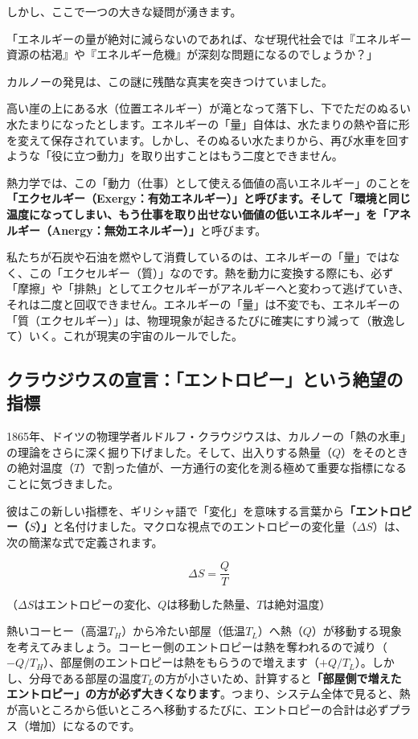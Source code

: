 しかし、ここで一つの大きな疑問が湧きます。

「エネルギーの量が絶対に減らないのであれば、なぜ現代社会では『エネルギー資源の枯渇』や『エネルギー危機』が深刻な問題になるのでしょうか？」

カルノーの発見は、この謎に残酷な真実を突きつけていました。

高い崖の上にある水（位置エネルギー）が滝となって落下し、下でただのぬるい水たまりになったとします。エネルギーの「量」自体は、水たまりの熱や音に形を変えて保存されています。しかし、そのぬるい水たまりから、再び水車を回すような「役に立つ動力」を取り出すことはもう二度とできません。

熱力学では、この「動力（仕事）として使える価値の高いエネルギー」のことを\textbf{「エクセルギー（Exergy：有効エネルギー）」と呼びます。そして「環境と同じ温度になってしまい、もう仕事を取り出せない価値の低いエネルギー」を「アネルギー（Anergy：無効エネルギー）」}と呼びます。

私たちが石炭や石油を燃やして消費しているのは、エネルギーの「量」ではなく、この「エクセルギー（質）」なのです。熱を動力に変換する際にも、必ず「摩擦」や「排熱」としてエクセルギーがアネルギーへと変わって逃げていき、それは二度と回収できません。エネルギーの「量」は不変でも、エネルギーの「質（エクセルギー）」は、物理現象が起きるたびに確実にすり減って（散逸して）いく。これが現実の宇宙のルールでした。

\subsection{クラウジウスの宣言：「エントロピー」という絶望の指標}

1865年、ドイツの物理学者ルドルフ・クラウジウスは、カルノーの「熱の水車」の理論をさらに深く掘り下げました。そして、出入りする熱量（\(Q\)）をそのときの絶対温度（\(T\)）で割った値が、一方通行の変化を測る極めて重要な指標になることに気づきました。

彼はこの新しい指標を、ギリシャ語で「変化」を意味する言葉から\textbf{「エントロピー（\(S\)）」}と名付けました。マクロな視点でのエントロピーの変化量（\(\Delta S\)）は、次の簡潔な式で定義されます。

\[
\Delta S=\frac{Q}{T}
\]

（\(\Delta S\)はエントロピーの変化、\(Q\)は移動した熱量、\(T\)は絶対温度）

熱いコーヒー（高温\(T_H\)）から冷たい部屋（低温\(T_L\)）へ熱（\(Q\)）が移動する現象を考えてみましょう。コーヒー側のエントロピーは熱を奪われるので減り（\(-Q/T_H\)）、部屋側のエントロピーは熱をもらうので増えます（\(+Q/T_L\)）。しかし、分母である部屋の温度\(T_L\)の方が小さいため、計算すると\textbf{「部屋側で増えたエントロピー」の方が必ず大きくなります}。つまり、システム全体で見ると、熱が高いところから低いところへ移動するたびに、エントロピーの合計は必ずプラス（増加）になるのです。

